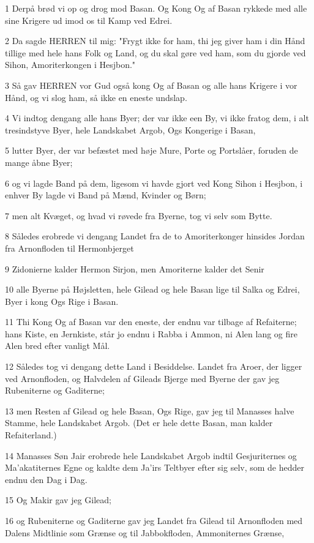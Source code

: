 \par 1 Derpå brød vi op og drog mod Basan. Og Kong Og af Basan rykkede med alle sine Krigere ud imod os til Kamp ved Edrei.
\par 2 Da sagde HERREN til mig: "Frygt ikke for ham, thi jeg giver ham i din Hånd tillige med hele hans Folk og Land, og du skal gøre ved ham, som du gjorde ved Sihon, Amoriterkongen i Hesjbon."
\par 3 Så gav HERREN vor Gud også kong Og af Basan og alle hans Krigere i vor Hånd, og vi slog ham, så ikke en eneste undslap.
\par 4 Vi indtog dengang alle hans Byer; der var ikke een By, vi ikke fratog dem, i alt tresindstyve Byer, hele Landskabet Argob, Ogs Kongerige i Basan,
\par 5 lutter Byer, der var befæstet med høje Mure, Porte og Portslåer, foruden de mange åbne Byer;
\par 6 og vi lagde Band på dem, ligesom vi havde gjort ved Kong Sihon i Hesjbon, i enhver By lagde vi Band på Mænd, Kvinder og Børn;
\par 7 men alt Kvæget, og hvad vi røvede fra Byerne, tog vi selv som Bytte.
\par 8 Således erobrede vi dengang Landet fra de to Amoriterkonger hinsides Jordan fra Arnonfloden til Hermonbjerget
\par 9 Zidonierne kalder Hermon Sirjon, men Amoriterne kalder det Senir
\par 10 alle Byerne på Højsletten, hele Gilead og hele Basan lige til Salka og Edrei, Byer i kong Ogs Rige i Basan.
\par 11 Thi Kong Og af Basan var den eneste, der endnu var tilbage af Refaiterne; hans Kiste, en Jernkiste, står jo endnu i Rabba i Ammon, ni Alen lang og fire Alen bred efter vanligt Mål.
\par 12 Således tog vi dengang dette Land i Besiddelse. Landet fra Aroer, der ligger ved Arnonfloden, og Halvdelen af Gileads Bjerge med Byerne der gav jeg Rubeniterne og Gaditerne;
\par 13 men Resten af Gilead og hele Basan, Ogs Rige, gav jeg til Manasses halve Stamme, hele Landskabet Argob. (Det er hele dette Basan, man kalder Refaiterland.)
\par 14 Manasses Søn Jair erobrede hele Landskabet Argob indtil Gesjuriternes og Ma'akatiternes Egne og kaldte dem Ja'irs Teltbyer efter sig selv, som de hedder endnu den Dag i Dag.
\par 15 Og Makir gav jeg Gilead;
\par 16 og Rubeniterne og Gaditerne gav jeg Landet fra Gilead til Arnonfloden med Dalens Midtlinie som Grænse og til Jabbokfloden, Ammoniternes Grænse,
